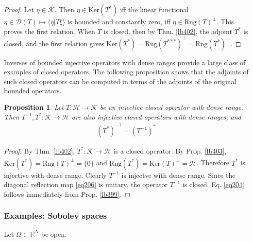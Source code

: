 \documentclass[12pt,b5paper,notitlepage]{article}
\theoremstyle{definition}
\theoremstyle{plain}
\newtheorem{pp}[df]{Proposition}
\newcommand{\ovl}{\overline}
\newcommand{\Dom}{\mathscr{D}}
\newcommand{\bk}[1]{\langle {#1}\rangle}
\newcommand{\Rbb}{\mathbb R}
\newcommand{\Ker}{\mathrm{Ker}}
\newcommand{\Rng}{\mathrm{Rng}}
\newcommand{\MH}{\mathcal H}
\newcommand{\MK}{\mathcal K}
\numberwithin{equation}{section}
\begin{document}
\begin{proof}
Let $\eta\in\MK$. Then $\eta\in\Ker(T^*)$ iff the linear functional $\eta\in\Dom(T)\mapsto \bk{\eta|T\xi}$ is bounded and constantly zero, iff $\eta\in\Rng(T)^\perp$. This proves the first relation. When $T$ is closed, then by Thm. \ref{lb402}, the adjoint $T^*$ is closed, and the first relation gives $\Ker(T^*)=\Rng(T^{***})^\perp=\Rng(T^*)^\perp$.
\end{proof}


Inverses of bounded injective operators with dense ranges provide a large class of examples of closed operators. The following proposition shows that the adjoints of such closed operators can be computed in terms of the adjoints of the original bounded operators.


\begin{pp}\label{lb404}
Let $T:\MH\rightarrow\MK$ be an injective closed operator with dense range. Then $T^{-1},T^*:\MK\rightarrow\MH$ are also injective closed operators with dense ranges, and
\begin{align}\label{eq204}
(T^*)^{-1}=(T^{-1})^*
\end{align}
\end{pp}

\begin{proof}
By Thm. \ref{lb402}, $T^*:\MK\rightarrow\MH$ is a closed operator. By Prop. \ref{lb403}, $\Ker(T^*)=\Rng(T)^\perp=\{0\}$ and $\ovl{\Rng(T^*)}=\Ker(T)^\perp=\MH$. Therefore $T^*$ is injective with dense range. Clearly $T^{-1}$ is injectve with dense range. Since the diagonal reflection map \eqref{eq206} is unitary, the operator $T^{-1}$ is closed.  Eq. \eqref{eq204} follows immediately from Prop. \ref{lb399}.
\end{proof}



\subsubsection{Examples: Sobolev spaces}\label{lb416}



Let $\Omega\subset\Rbb^N$ be open. 
\end{document}
